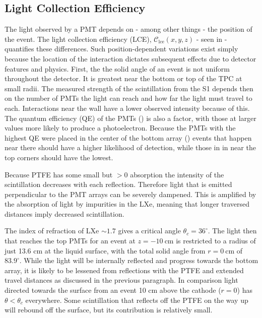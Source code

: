 {\subsection{Light Collection Efficiency}
\label{subsec:det_char_lce}
The light observed by a PMT depends on - among other things - the position of the event.  The light collection efficiency (LCE),
$\mathcal{C}_{\mathrm{lce}}(x, y, z)$ - seen in  - quantifies these differences.  Such position-dependent variations
exist simply because the location of
the interaction dictates subsequent effects due to detector features and physics.  First, the the solid angle of an event is not uniform
throughout the detector.  It is greatest near the bottom or top of the TPC at small radii.  The measured strength of the scintillation
from the S1 depends then on the number of PMTs the light can reach and how far the light must travel to each.  Interactions near the
wall have a lower observed intensity because of this.  The quantum efficiency (QE) of the PMTs () is also a
factor, with those at larger values more likely to produce a photoelectron.  Because the PMTs with the highest QE were placed in the
center of the bottom array () events that happen near there should have a higher likelihood of detection,
while those in in near the top corners should have the lowest.

Because PTFE has some small but $> 0$ absorption the intensity of the scintillation decreases with each reflection.  Therefore light
that is emitted perpendicular to the PMT arrays can be severely dampened.  This is amplified by the absorption of light by
impurities in the LXe, meaning that longer traversed distances imply decreased scintillation.

The index of refraction of LXe ${\sim} 1.7$
gives a critical angle $\theta_c = 36^{\circ}$.  The light then that reaches the top PMTs for an event at
$z = -10\ \mathrm{cm}$ is restricted to a radius of just 13.6 cm at the liquid surface, with the total solid angle from
$r = 0\ \mathrm{cm}$ of $83.9^{\circ}$.  While the light will be internally reflected and progress towards the bottom array, it is likely
to be lessened from reflections with the PTFE and extended travel distances as discussed in the previous paragraph. In comparison light
directed towards the surface from an event 10 cm above the cathode ($r = 0$)
has $\theta < \theta_c$ everywhere.  Some scintillation that reflects off the PTFE on the way up will rebound off the surface, but its
contribution is relatively small.

}
